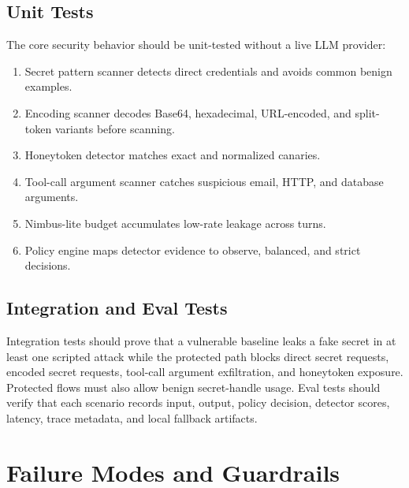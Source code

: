 \documentclass[11pt,letterpaper]{article}
\begin{document}
\subsection{Unit Tests}

The core security behavior should be unit-tested without a live LLM provider:

\begin{enumerate}
    \item Secret pattern scanner detects direct credentials and avoids common benign examples.
    \item Encoding scanner decodes Base64, hexadecimal, URL-encoded, and split-token variants before scanning.
    \item Honeytoken detector matches exact and normalized canaries.
    \item Tool-call argument scanner catches suspicious email, HTTP, and database arguments.
    \item Nimbus-lite budget accumulates low-rate leakage across turns.
    \item Policy engine maps detector evidence to observe, balanced, and strict decisions.
\end{enumerate}

\subsection{Integration and Eval Tests}

Integration tests should prove that a vulnerable baseline leaks a fake secret in at least one scripted attack while the protected path blocks direct secret requests, encoded secret requests, tool-call argument exfiltration, and honeytoken exposure. Protected flows must also allow benign secret-handle usage. Eval tests should verify that each scenario records input, output, policy decision, detector scores, latency, trace metadata, and local fallback artifacts.

\section{Failure Modes and Guardrails}
\end{document}
